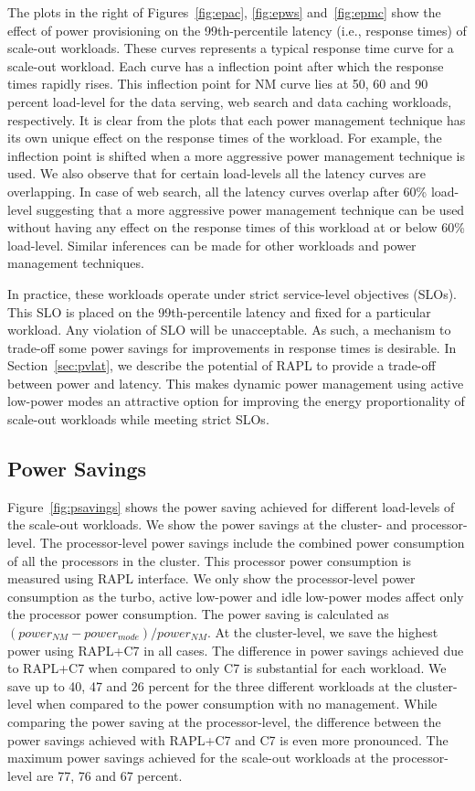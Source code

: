 \documentclass{sig-alternate}
\begin{document}
The plots in the right of Figures~\ref{fig:epac}, \ref{fig:epws} and~\ref{fig:epmc} 
show the effect of power provisioning on the 99th-percentile latency (i.e., response times) 
of scale-out workloads. These curves represents a typical response time curve for a scale-out workload.
Each curve has a inflection point after which the response times 
rapidly rises. This inflection point for NM curve lies at 50, 60 and 90 percent load-level for the 
data serving, web search and data caching workloads, respectively. It is clear from the plots 
that each power management technique has its own unique effect on the response times of the 
workload. For example, the inflection point is shifted when a more aggressive power management 
technique is used. We also observe that for certain load-levels all the latency curves are 
overlapping. In case of web search, all the latency curves overlap after 60\% load-level 
suggesting that a more aggressive power management technique can be used without having 
any effect on the response times of this workload at or below 60\% load-level. Similar 
inferences can be made for other workloads and power management techniques. 

In practice, these workloads operate under strict service-level objectives (SLOs). This SLO is placed
on the 99th-percentile latency and fixed for a particular workload. Any violation of SLO will be 
unacceptable. As such, a mechanism to trade-off some power savings for improvements in response times is 
desirable. In Section~\ref{sec:pvlat}, we describe the potential of RAPL to provide a trade-off 
between power and latency. This makes dynamic power management using active low-power modes 
an attractive option for improving the energy proportionality of scale-out workloads while meeting 
strict SLOs.

\subsection{Power Savings}

Figure~\ref{fig:psavings} shows the power saving achieved for different load-levels of the scale-out workloads. 
We show the power savings at the cluster- and processor-level. The processor-level 
power savings include the combined power consumption of all the processors in the 
cluster. This processor power consumption is measured using RAPL interface. We only show 
the processor-level power consumption as the turbo, active low-power and idle low-power 
modes affect only the processor power consumption. The power 
saving is calculated as $(power_{NM} - power_{mode})/power_{NM}$. At the 
cluster-level, we save the highest power using RAPL+C7 in all 
cases. The difference in power savings achieved due to RAPL+C7 when compared to only C7 
is substantial for each workload. We save up to 40, 47 and 26 percent 
for the three different workloads at the cluster-level when compared to the 
power consumption with no management. While comparing the power saving at 
the processor-level, the difference between the power savings achieved 
with RAPL+C7 and C7 is even more pronounced. The maximum power savings 
achieved for the scale-out workloads at the processor-level are 77, 76 and 67 
percent. 
\end{document}
